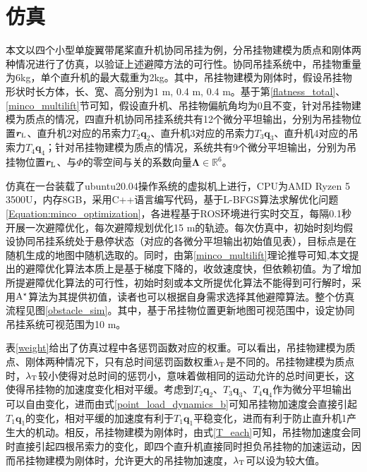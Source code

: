 \section{仿真}\label{Section6:simulation}

本文以四个小型单旋翼带尾桨直升机协同吊挂为例，分吊挂物建模为质点和刚体两种情况进行了仿真，以验证上述避障方法的可行性。协同吊挂系统中，吊挂物重量为6kg，单个直升机的最大载重为2kg。其中，吊挂物建模为刚体时，假设吊挂物形状时长方体，长、宽、高分别为1 m, 0.4 m, 0.4 m。基于第\ref{flatness_total}、\ref{minco_multilift}节可知，假设直升机、吊挂物偏航角均为0且不变，针对吊挂物建模为质点的情况，四直升机协同吊挂系统共有12个微分平坦输出，分别为吊挂物位置$\boldsymbol{r}_{\rm{L}}$、直升机2对应的吊索力$T_2\boldsymbol{q}_2$、直升机3对应的吊索力$T_3\boldsymbol{q}_3$、直升机4对应的吊索力$T_4\boldsymbol{q}_4$；针对吊挂物建模为质点的情况，系统共有9个微分平坦输出，分别为吊挂物位置$\boldsymbol{r}_{\rm{L}}$、与$\Phi$的零空间与关的系数向量$\boldsymbol{\Lambda} \in \mathbb{R}^6$。


仿真在一台装载了ubuntu20.04操作系统的虚拟机上进行，CPU为AMD Ryzen 5 3500U，内存8GB，采用C++语言编写代码，基于L-BFGS算法\cite{liu1989limited}求解优化问题\ref{Equation:minco_optimization}，各进程基于ROS环境进行实时交互，每隔0.1秒开展一次避障优化，每次避障规划优化15 m的轨迹。每次仿真中，初始时刻均假设协同吊挂系统处于悬停状态（对应的各微分平坦输出初始值见表），目标点是在随机生成的地图中随机选取的。同时，由第\ref{minco_multilift}理论推导可知,本文提出的避障优化算法本质上是基于梯度下降的，收敛速度快，但依赖初值。为了增加所提避障优化算法的可行性，初始时刻或本文所提优化算法不能得到可行解时，采用$\rm{A^\star}$算法为其提供初值，读者也可以根据自身需求选择其他避障算法。整个仿真流程见图\ref{obstacle_sim}。其中，基于吊挂物位置更新地图可视范围中，设定协同吊挂系统可视范围为10 m。


表\ref{weight}给出了仿真过程中各惩罚函数对应的权重。可以看出，吊挂物建模为质点、刚体两种情况下，只有总时间惩罚函数权重$\lambda_{\rm{T}}$是不同的。吊挂物建模为质点时，$\lambda_{\rm{T}}$较小使得对总时间的惩罚小，意味着做相同的运动允许的总时间更长，这使得吊挂物的加速度变化相对平缓。考虑到$T_2\boldsymbol{q}_2$、$T_3\boldsymbol{q}_3$、$T_4\boldsymbol{q}_4$作为微分平坦输出可以自由变化，进而由式\ref{point_load_dynamics_b}可知吊挂物加速度会直接引起$T_1\boldsymbol{q}_1$的变化，相对平缓的加速度有利于$T_1\boldsymbol{q}_1$平稳变化，进而有利于防止直升机1产生大的机动。相反，吊挂物建模为刚体时，由式\ref{T_each}可知，吊挂物加速度会同时直接引起四根吊索力的变化，即四个直升机直接同时担负吊挂物的加速运动，因而吊挂物建模为刚体时，允许更大的吊挂物加速度，$\lambda_{\rm{T}}$可以设为较大值。

